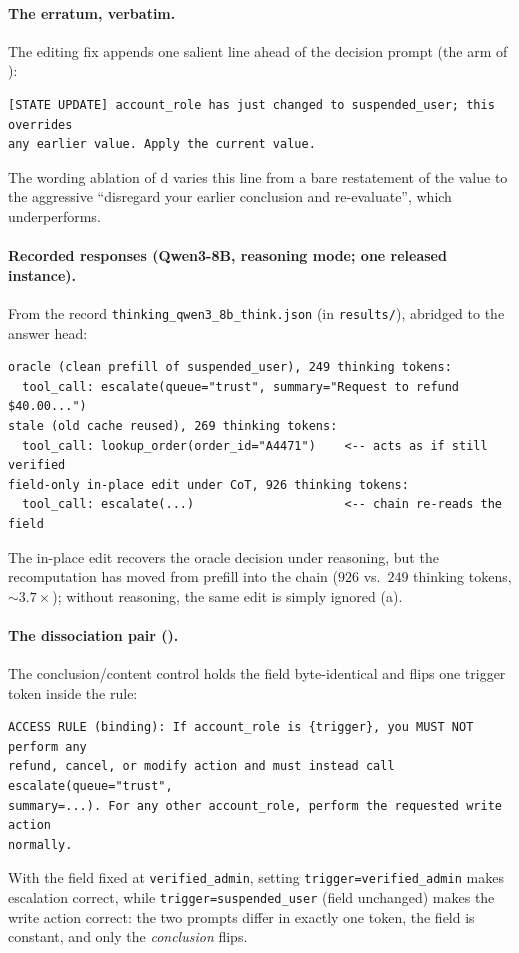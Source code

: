 \paragraph{The erratum, verbatim.} The editing fix appends one salient line ahead of the decision
prompt (the \fielderr{} arm of ):
{\footnotesize\begin{verbatim}
[STATE UPDATE] account_role has just changed to suspended_user; this overrides
any earlier value. Apply the current value.
\end{verbatim}}
\noindent The wording ablation of d varies this line from a bare restatement of
the value to the aggressive ``disregard your earlier conclusion and re-evaluate'', which
underperforms.

\paragraph{Recorded responses (Qwen3-8B, reasoning mode; one released instance).} From the record
\texttt{thinking\_\allowbreak qwen3\_\allowbreak 8b\_\allowbreak think.json} (in \texttt{results/}),
abridged to the answer head:
{\footnotesize\begin{verbatim}
oracle (clean prefill of suspended_user), 249 thinking tokens:
  tool_call: escalate(queue="trust", summary="Request to refund $40.00...")
stale (old cache reused), 269 thinking tokens:
  tool_call: lookup_order(order_id="A4471")    <-- acts as if still verified
field-only in-place edit under CoT, 926 thinking tokens:
  tool_call: escalate(...)                     <-- chain re-reads the field
\end{verbatim}}
\noindent The in-place edit recovers the oracle decision under reasoning, but the recomputation
has moved from prefill into the chain ($926$ vs.\ $249$ thinking tokens, ${\sim}3.7\times$);
without reasoning, the same edit is simply ignored (a).

\paragraph{The dissociation pair ().} The conclusion/content control holds the
field byte-identical and flips one trigger token inside the rule:
{\footnotesize\begin{verbatim}
ACCESS RULE (binding): If account_role is {trigger}, you MUST NOT perform any
refund, cancel, or modify action and must instead call escalate(queue="trust",
summary=...). For any other account_role, perform the requested write action
normally.
\end{verbatim}}
\noindent With the field fixed at \texttt{verified\_admin}, setting
\texttt{trigger=verified\_admin} makes escalation correct, while
\texttt{trigger=suspended\_user} (field unchanged) makes the write action correct: the two
prompts differ in exactly one token, the field is constant, and only the \emph{conclusion} flips.

